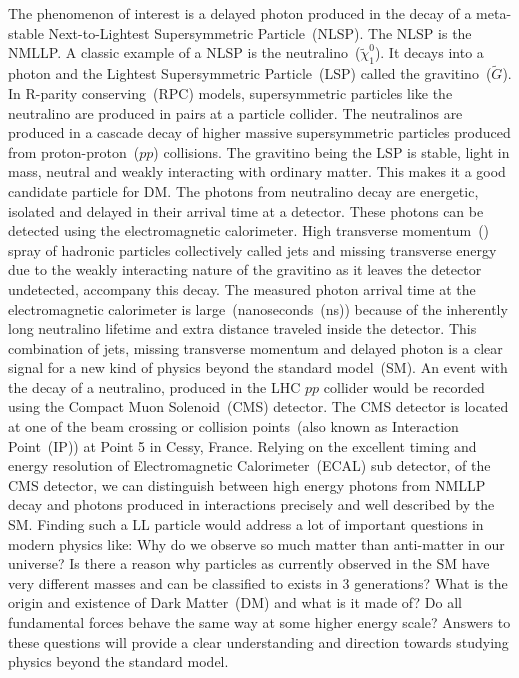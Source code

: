 \paragraph*{}\mbox{}\\
The phenomenon of interest is a delayed photon produced in the decay of a meta-stable Next-to-Lightest Supersymmetric Particle~(NLSP). The NLSP is the NMLLP. A classic example of a NLSP is the neutralino~($\tilde{\chi}^{0}_{1} $). It decays into a photon and the Lightest Supersymmetric Particle~(LSP) called the gravitino~($\tilde{G}$). In R-parity conserving~(RPC) models, supersymmetric particles like the neutralino are produced in pairs at a  particle collider. The neutralinos are produced in a cascade decay of higher massive  supersymmetric particles produced from proton-proton~($pp$) collisions. The gravitino being the LSP is stable, light in mass, neutral and weakly interacting with ordinary matter. This makes it a good candidate particle for DM. The photons from neutralino decay are energetic, isolated and delayed in their arrival time at a detector. These photons can be detected using the electromagnetic calorimeter. High transverse momentum~(\pt) spray of hadronic particles collectively called jets and missing transverse energy due to the weakly interacting nature of the gravitino as it leaves the detector undetected, accompany this decay. The measured photon arrival time at the electromagnetic calorimeter  is large~(nanoseconds~(ns)) because of the inherently long neutralino lifetime and extra distance traveled inside the detector. This combination of jets, missing transverse momentum and delayed photon is a clear signal for a new kind of physics beyond the standard model~(SM).
An event with the decay of a neutralino, produced in the LHC $pp$ collider would be recorded using the Compact Muon Solenoid~(CMS) detector.
The CMS detector is located at one of the beam crossing or collision points~(also known as Interaction Point~(IP)) at Point 5 in Cessy, France.
Relying on the excellent timing and energy resolution of Electromagnetic Calorimeter~(ECAL) sub detector, of the CMS detector, we can distinguish between high energy photons from NMLLP decay and photons
produced in interactions precisely and well described by the SM. 
Finding such a LL particle would address a lot of important questions in modern physics like: Why do we observe so much matter than anti-matter in our universe?
Is there a reason why particles as currently observed in the SM have very different masses and can be classified to exists in 3 generations? What is the origin and existence of Dark Matter~(DM) and what is it made of?  
Do all fundamental forces behave the same way at some higher energy scale?
Answers to these questions will provide a clear understanding and direction towards studying physics beyond the standard model.
